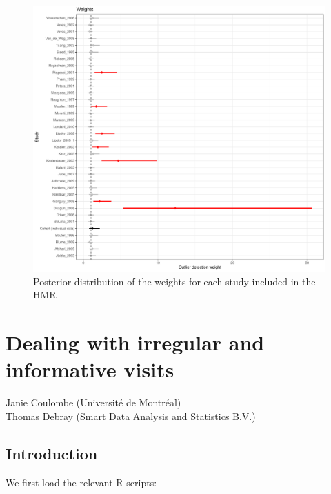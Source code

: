 \documentclass[
  letterpaper,
  DIV=11,
  numbers=noendperiod]{scrreprt}
\begin{document}
\begin{figure}

{\centering \includegraphics{chapter_11_files/figure-pdf/unnamed-chunk-7-1.pdf}

}

\caption{Posterior distribution of the weights for each study included
in the HMR}

\end{figure}


\hypertarget{dealing-with-irregular-and-informative-visits}{%
\chapter{Dealing with irregular and informative
visits}\label{dealing-with-irregular-and-informative-visits}}

Janie Coulombe (Université de Montréal)\\
Thomas Debray (Smart Data Analysis and Statistics B.V.)

\hfill\break

\hypertarget{introduction-3}{%
\section{Introduction}\label{introduction-3}}

We first load the relevant R scripts:
\end{document}
